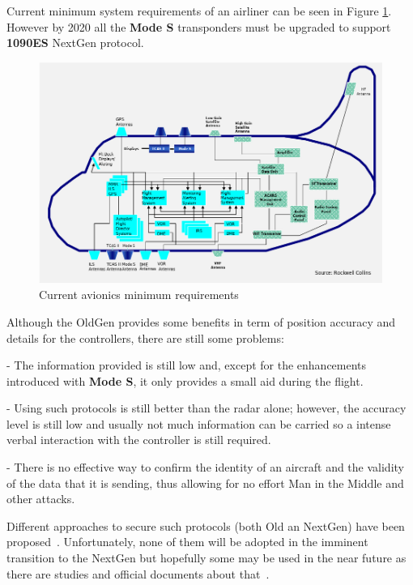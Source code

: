 \documentclass[../main.tex]{subfiles}
\begin{document}
Current minimum system requirements of an airliner can be seen in Figure \ref{fig:modern}. However by 2020 all the \textbf{Mode S} transponders must be upgraded to support \textbf{1090ES} NextGen protocol.

\begin{figure}[htp]
  \centering
  \includegraphics[scale=0.63]{images/current_avionics.png}
  \caption{Current avionics minimum requirements}
  \label{fig:modern}
\end{figure}

Although the OldGen provides some benefits in term of position accuracy and details for the controllers, there are still some problems:

- The information provided is still low and, except for the enhancements introduced with \textbf{Mode S}, it only provides a small aid during the flight.

- Using such protocols is still better than the radar alone; however, the accuracy level is still low and usually not much information can be carried so a intense verbal interaction with the controller is still required.

- There is no effective way to confirm the identity of an aircraft and the validity of the data that it is sending, thus allowing for no effort Man in the Middle and other attacks.

Different approaches to secure such protocols (both Old an NextGen) have been proposed~\cite{nextgenenc}. Unfortunately, none of them will be adopted in the imminent transition to the NextGen but hopefully some may be used in the near future as there are studies and official documents about that~\cite{adsbimp}.

\bigskip
\end{document}
